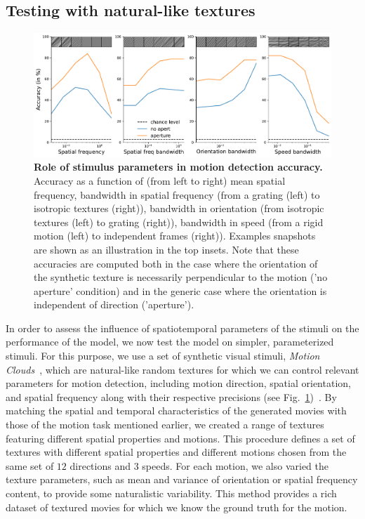 \documentclass[default]{sn-jnl}%
\theoremstyle{thmstyleone}%
\theoremstyle{thmstyletwo}%
\theoremstyle{thmstylethree}%
\newcommand{\seeFig}[1]{see Fig.~\ref{fig:#1}}%
\begin{document}
\subsection{Testing with natural-like textures}
\begin{figure}%
    \centering
    \includegraphics[width=0.99\linewidth]{figures/motion_clouds.pdf} %
    \caption{{\bf Role of stimulus parameters in motion detection accuracy.} Accuracy as a function of (from left to right) mean spatial frequency, bandwidth in spatial frequency (from a grating (left) to isotropic textures (right)), bandwidth in orientation (from isotropic textures (left) to grating (right)), bandwidth in speed (from a rigid motion (left) to independent frames (right)). Examples snapshots are shown as an illustration in the top insets. Note that these accuracies are computed both in the case where the orientation of the synthetic texture is necessarily perpendicular to the motion ('no aperture' condition) and in the generic case where the orientation is independent of direction ('aperture').
    }
    \label{fig:motion_clouds}
\end{figure}
In order to assess the influence of spatiotemporal parameters of the stimuli on the performance of the model, we now test the model on simpler, parameterized stimuli. For this purpose, we use a set of synthetic visual stimuli, \textit{Motion Clouds}~\citep{leon_motion_2012}, which are natural-like random textures for which we can control relevant parameters for motion detection, including motion direction, spatial orientation, and spatial frequency along with their respective precisions (\seeFig{motion_clouds})~\citep{Leon2012,vacher_bayesian_2018}. By matching the spatial and temporal characteristics of the generated movies with those of the motion task mentioned earlier, we created a range of textures featuring different spatial properties and motions. This procedure defines a set of textures with different spatial properties and different motions chosen from the same set of $12$ directions and $3$ speeds. For each motion, we also varied the texture parameters, such as mean and variance of orientation or spatial frequency content, to provide some naturalistic variability. This method provides a rich dataset of textured movies for which we know the ground truth for the motion.
\end{document}
